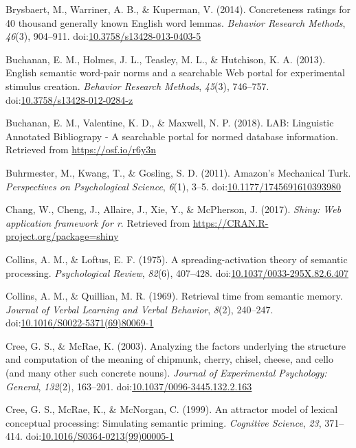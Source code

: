 \documentclass[english,man]{apa6}
\theoremstyle{definition}
\theoremstyle{definition}
\theoremstyle{definition}
\theoremstyle{remark}
\begin{document}
\hypertarget{ref-Brysbaert2013}{}
Brysbaert, M., Warriner, A. B., \& Kuperman, V. (2014). Concreteness
ratings for 40 thousand generally known English word lemmas.
\emph{Behavior Research Methods}, \emph{46}(3), 904--911.
doi:\href{https://doi.org/10.3758/s13428-013-0403-5}{10.3758/s13428-013-0403-5}

\hypertarget{ref-Buchanan2013}{}
Buchanan, E. M., Holmes, J. L., Teasley, M. L., \& Hutchison, K. A.
(2013). English semantic word-pair norms and a searchable Web portal for
experimental stimulus creation. \emph{Behavior Research Methods},
\emph{45}(3), 746--757.
doi:\href{https://doi.org/10.3758/s13428-012-0284-z}{10.3758/s13428-012-0284-z}

\hypertarget{ref-Buchanan2018}{}
Buchanan, E. M., Valentine, K. D., \& Maxwell, N. P. (2018). LAB:
Linguistic Annotated Bibliograpy - A searchable portal for normed
database information. Retrieved from \url{https://osf.io/r6y3n}

\hypertarget{ref-Buhrmester2011}{}
Buhrmester, M., Kwang, T., \& Gosling, S. D. (2011). Amazon's Mechanical
Turk. \emph{Perspectives on Psychological Science}, \emph{6}(1), 3--5.
doi:\href{https://doi.org/10.1177/1745691610393980}{10.1177/1745691610393980}

\hypertarget{ref-R-shiny}{}
Chang, W., Cheng, J., Allaire, J., Xie, Y., \& McPherson, J. (2017).
\emph{Shiny: Web application framework for r}. Retrieved from
\url{https://CRAN.R-project.org/package=shiny}

\hypertarget{ref-Collins1975}{}
Collins, A. M., \& Loftus, E. F. (1975). A spreading-activation theory
of semantic processing. \emph{Psychological Review}, \emph{82}(6),
407--428.
doi:\href{https://doi.org/10.1037/0033-295X.82.6.407}{10.1037/0033-295X.82.6.407}

\hypertarget{ref-Collins1969}{}
Collins, A. M., \& Quillian, M. R. (1969). Retrieval time from semantic
memory. \emph{Journal of Verbal Learning and Verbal Behavior},
\emph{8}(2), 240--247.
doi:\href{https://doi.org/10.1016/S0022-5371(69)80069-1}{10.1016/S0022-5371(69)80069-1}

\hypertarget{ref-Cree2003}{}
Cree, G. S., \& McRae, K. (2003). Analyzing the factors underlying the
structure and computation of the meaning of chipmunk, cherry, chisel,
cheese, and cello (and many other such concrete nouns). \emph{Journal of
Experimental Psychology: General}, \emph{132}(2), 163--201.
doi:\href{https://doi.org/10.1037/0096-3445.132.2.163}{10.1037/0096-3445.132.2.163}

\hypertarget{ref-Cree1999}{}
Cree, G. S., McRae, K., \& McNorgan, C. (1999). An attractor model of
lexical conceptual processing: Simulating semantic priming.
\emph{Cognitive Science}, \emph{23}, 371--414.
doi:\href{https://doi.org/10.1016/S0364-0213(99)00005-1}{10.1016/S0364-0213(99)00005-1}
\end{document}
